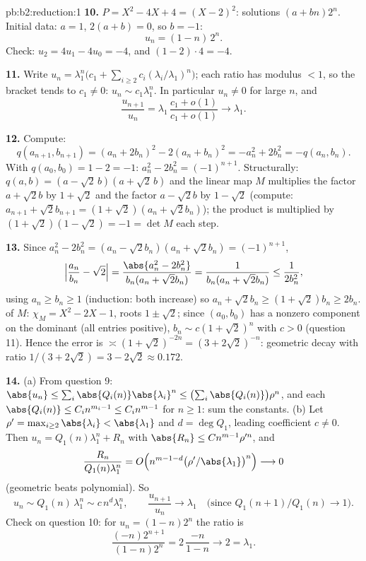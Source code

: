 \begin{solution}{pb:b2:reduction:1}
\textbf{10.} $P = X^2 - 4X + 4 = (X - 2)^2$: solutions $(a +
bn)2^n$. Initial data: $a = 1$, $2(a + b) = 0$, so $b = -1$:
\[
u_n = (1 - n)\,2^n .
\]
Check: $u_2 = 4u_1 - 4u_0 = -4$, and $(1 - 2)\cdot4 = -4$.

\textbf{11.} Write $u_n = \lambda_1^n\bigl(c_1 + \sum_{i\geq2}
c_i(\lambda_i/\lambda_1)^n\bigr)$; each ratio has modulus $< 1$,
so the bracket tends to $c_1 \neq 0$: $u_n \sim c_1\lambda_1^n$.
In particular $u_n \neq 0$ for large $n$, and
\[
\frac{u_{n+1}}{u_n} =
\lambda_1\,\frac{c_1 + o(1)}{c_1 + o(1)} \longrightarrow
\lambda_1 .
\]

\textbf{12.} Compute:
\[
q(a_{n+1}, b_{n+1}) = (a_n + 2b_n)^2 - 2(a_n + b_n)^2
= -a_n^2 + 2b_n^2 = -q(a_n, b_n).
\]
With $q(a_0, b_0) = 1 - 2 = -1$: $a_n^2 - 2b_n^2 = (-1)^{n+1}$.
Structurally: $q(a, b) = (a - \sqrt2\,b)(a + \sqrt2\,b)$ and
the linear map $M$ multiplies the factor $a + \sqrt2 b$ by $1 +
\sqrt2$ and the factor $a - \sqrt2 b$ by $1 - \sqrt2$ (compute:
$a_{n+1} + \sqrt2 b_{n+1} = (1 + \sqrt2)(a_n + \sqrt2 b_n)$);
the product is multiplied by $(1 + \sqrt2)(1 - \sqrt2) = -1 =
\det M$ each step.

\textbf{13.} Since $a_n^2 - 2b_n^2 = (a_n - \sqrt2 b_n)(a_n +
\sqrt2 b_n) = (-1)^{n+1}$,
\[
\Bigl|\frac{a_n}{b_n} - \sqrt2\Bigr|
= \frac{\abs{a_n^2 - 2b_n^2}}{b_n(a_n + \sqrt2 b_n)}
= \frac{1}{b_n(a_n + \sqrt2 b_n)} \leq \frac1{2b_n^2},
\]
using $a_n \geq b_n \geq 1$ (induction: both increase) so $a_n +
\sqrt2 b_n \geq (1 + \sqrt2)b_n \geq 2b_n$.  of $M$:
$\chi_M = X^2 - 2X - 1$, roots $1 \pm \sqrt2$; since $(a_0, b_0)$
has a nonzero component on the dominant  (all entries
positive), $b_n \sim c(1 + \sqrt2)^n$ with $c > 0$ (question
11). Hence the error is $\asymp (1 + \sqrt2)^{-2n} = (3 +
2\sqrt2)^{-n}$: geometric decay with ratio $1/(3 + 2\sqrt2) = 3
- 2\sqrt2 \approx 0.172$.

\textbf{14.} (a) From question 9: $\abs{u_n} \leq \sum_i
\abs{Q_i(n)}\abs{\lambda_i}^n \leq \bigl(\sum_i
\abs{Q_i(n)}\bigr)\rho^n$, and each $\abs{Q_i(n)} \leq C_i
n^{m_i - 1} \leq C_i n^{m-1}$ for $n \geq 1$: sum the constants.
(b) Let $\rho' = \max_{i \geq 2}\abs{\lambda_i} <
\abs{\lambda_1}$ and $d = \deg Q_1$, leading coefficient $c
\neq 0$. Then $u_n = Q_1(n)\lambda_1^n + R_n$ with $\abs{R_n}
\leq Cn^{m-1}\rho'^n$, and
\[
\frac{R_n}{Q_1(n)\lambda_1^n} = O\Bigl(n^{m-1-d}
\bigl(\rho'/\abs{\lambda_1}\bigr)^n\Bigr) \longrightarrow 0
\]
(geometric beats polynomial). So
\[
u_n \sim Q_1(n)\,\lambda_1^n \sim c\,n^d\lambda_1^n,
\qquad
\frac{u_{n+1}}{u_n} \longrightarrow \lambda_1
\quad\text{(since } Q_1(n{+}1)/Q_1(n) \to 1\text{)}.
\]
Check on question 10: for $u_n = (1-n)2^n$ the ratio is
\[
\frac{(-n)2^{n+1}}{(1-n)2^n} = 2\,\frac{-n}{1-n}
\longrightarrow 2 = \lambda_1 .
\]


\end{solution}

